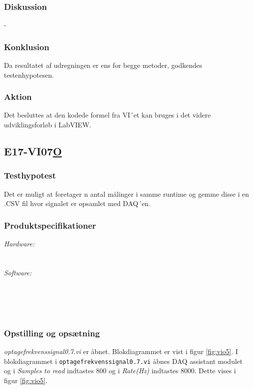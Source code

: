 		\subsubsection{Diskussion} 
	-
	
	
		\subsubsection{Konklusion}
		 
Da resultatet af udregningen er ens for begge metoder, godkendes testenhypotesen.  
	
	   \subsubsection{Aktion}
Det besluttes at den kodede formel fra VI´et kan bruges i det videre udviklingsforløb i LabVIEW. 


\subsection{E17-VI07\underline{O}}
\subsubsection{Testhypotest}
Det er muligt at foretager n antal målinger i samme runtime og gemme disse i en .CSV fil hvor signalet er opsamlet med DAQ´en. 
\subsubsection{Produktspecifikationer}
\textit{Hardware:}\\
		\PC\\
		\daq\\
	
		\textit{Software:}\\
		\labview\\
		\visa\\
		\vi\\
		\daqsoft\\
\subsubsection{Opstilling og opsætning}
\textit{optagefrekvenssignal0.7.vi} er åbnet. Blokdiagrammet er vist i figur \ref{fig:vio5}. I blokdiagrammet i \texttt{optagefrekvenssignal0.7.vi} åbnes DAQ assistant modulet og i \textit{Samples to read} indtastes 800 og i \textit{Rate(Hz)} indtastes 8000. Dette vises i figur \ref{fig:vio5}.   
		

